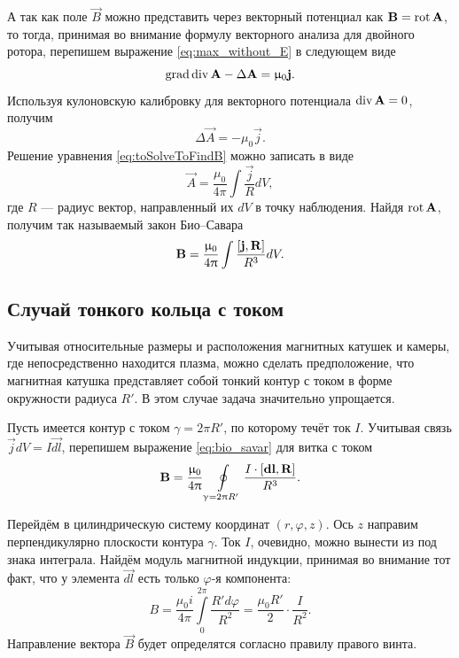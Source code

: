 А так как поле $\vec{B}$ можно представить через векторный потенциал как  $\mathbf{B} = \operatorname{rot} \mathbf{A}$, то тогда, принимая во внимание формулу векторного анализа для двойного ротора, перепишем выражение \eqref{eq:max_without_E} в следующем виде
\begin{equation}
	\operatorname{grad} \operatorname{div} \mathbf{A} - \Delta \mathbf{A} = \upmu_0 \mathbf{j}.
\end{equation}
Используя кулоновскую калибровку для векторного потенциала $\operatorname{div} \mathbf{A} = 0$, получим
\begin{equation}
	\Delta \vec{A} = - \mu_0 \vec{j}. \label{eq:toSolveToFindB}
\end{equation}
Решение уравнения \eqref{eq:toSolveToFindB} можно записать в виде \cite{Landau2}
\begin{equation}
	\vec{A} = \frac{\mu_0}{4 \pi} \int \frac{\vec{j}}{R} dV,
\end{equation}
где $R$ --- радиус вектор, направленный их $dV$ в точку наблюдения. Найдя $\operatorname{rot} \mathbf{A}$, получим так называемый закон Био--Савара
\begin{equation}
	\mathbf{B} = \frac{\upmu_0}{4 \uppi} \int \frac{\left[ \mathbf{{j}},\mathbf{{R}} \right]}{R^3} dV.
	\label{eq:bio_savar}
\end{equation}

\subsection{Случай тонкого кольца с током}

Учитывая относительные размеры и расположения магнитных катушек и камеры, где непосредственно находится плазма, можно сделать предположение, что магнитная катушка представляет собой тонкий контур с током в форме окружности радиуса $R'$. В этом случае задача значительно упрощается. 

Пусть имеется контур с током $\gamma = 2 \pi R'$, по которому течёт ток $I$. Учитывая связь $\vec{j} dV = I \vec{dl}$, перепишем выражение \eqref{eq:bio_savar} для витка с током
\begin{equation}
	\mathbf{B} = \frac{\upmu_0}{4 \uppi} \oint \limits_{\upgamma = 2 \uppi R'} \frac{I \cdot \left[ \mathbf{{dl}},\mathbf{{R}} \right]}{R^3}.
	\label{eq:bio_savar_curl}
\end{equation}

Перейдём в цилиндрическую систему координат $(r,\varphi,z)$. Ось $z$ направим перпендикулярно плоскости контура $\gamma$. Ток $I$, очевидно, можно вынести из под знака интеграла. Найдём модуль магнитной индукции, принимая во внимание тот факт, что у элемента $\vec{dl}$ есть только $\varphi$-я компонента:
\begin{equation}
	B = \frac{\mu_0 i}{4 \pi}  \int \limits_0^{2 \pi} \frac{R' d \varphi}{R^2} = \frac{\mu_0 R'}{2} \cdot \frac{I}{R^2}.
	\label{eq:calcBcyl}
\end{equation}
Направление вектора $\vec{B}$ будет определятся согласно правилу правого винта.
